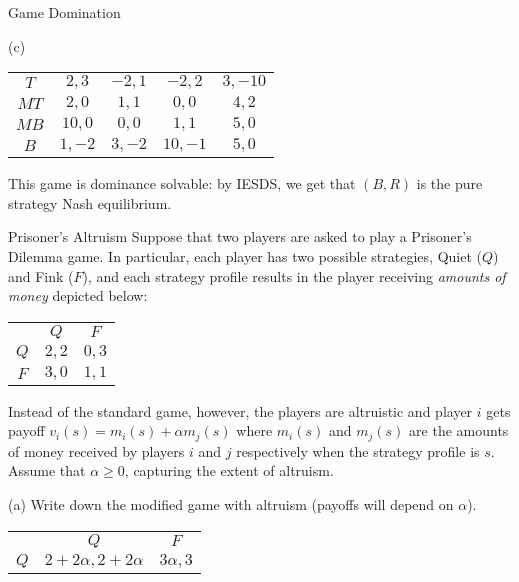 \documentclass[10pt]{extarticle}
\begin{document}
\begin{problem}{Game Domination}
\begin{problem}{(c)}
\begin{center}
\begin{tabular}{c|c|c|c|c|}
          \cline{2-5}
          $T$ & $2,3$ & $-2,1$ & $-2,2$ & $3,-10$\\
          \cline{2-5}
          $MT$ & $2,0$ & $1,1$ & $0,0$ & $4,2$\\
          \cline{2-5}
          $MB$ & $10,0$ & $0,0$ & $1,1$ & $5,0$\\
          \cline{2-5}
          $B$ & $1,-2$ & $3,-2$ & $10,-1$ & $5,0$\\
          \cline{2-5}
        \end{tabular}
      \end{center}
      \tcblower
      This game is dominance solvable: by IESDS, we get that $(B,R)$ is the pure strategy Nash equilibrium.
    \end{problem}
  \end{problem}
  \begin{problem}{Prisoner's Altruism}
    Suppose that two players are asked to play a Prisoner's Dilemma game. In particular, each player has two possible strategies, Quiet ($Q$) and Fink ($F$), and each strategy profile results in the player receiving \textit{amounts of money} depicted below:
    \begin{center}
      \begin{tabular}{c|c|c|}
        \multicolumn{1}{c}{} & \multicolumn{1}{c}{$Q$} & \multicolumn{1}{c}{$F$}\\
        \cline{2-3}
        $Q$ & $2,2$ & $0,3$ \\
        \cline{2-3}
        $F$ & $3,0$ & $1,1$\\
        \cline{2-3}
      \end{tabular}
    \end{center}
    Instead of the standard game, however, the players are altruistic and player $i$ gets payoff $v_i(s) = m_i(s) + \alpha m_j(s)$ where $m_i(s)$ and $m_j(s)$ are the amounts of money received by players $i$ and $j$ respectively when the strategy profile is $s$. Assume that $\alpha \geq 0$, capturing the extent of altruism.
    \begin{problem}{(a)}
      Write down the modified game with altruism (payoffs will depend on $\alpha$).
      \tcblower
      \begin{center}
        \begin{tabular}{c|c|c|}
          \multicolumn{1}{c}{} & \multicolumn{1}{c}{$Q$} & \multicolumn{1}{c}{$F$}\\
          \cline{2-3}
          $Q$ & $2+2\alpha,2+2\alpha$ & $3\alpha,3$ \\

\end{tabular}
\end{center}
\end{problem}
\end{problem}
\end{document}
